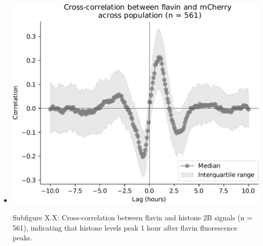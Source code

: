 \begin{itemize}
\begin{itemize}
\item \begin{center}
\includegraphics[width=.9\linewidth]{pyruvate_xcf_edit.pdf}
\end{center} Subfigure X.X: Cross-correlation between flavin and histone 2B signals (n = 561), indicating that histone levels peak 1 hour after flavin fluorescence peaks.
\end{itemize}
\end{itemize}

